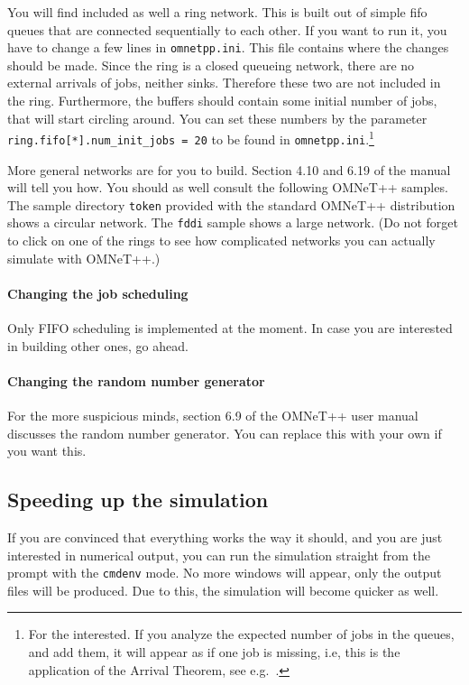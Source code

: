 \documentclass[a4paper]{article}
\begin{document}
You will find included as well a ring network. This is built out of
simple fifo queues that are connected sequentially to each other. If
you want to run it, you have to change a few lines in
\texttt{omnetpp.ini}. This file contains where the changes should be
made. Since the ring is a closed queueing network, there are no
external arrivals of jobs, neither sinks. Therefore these two are not
included in the ring. Furthermore, the buffers should contain some
initial number of jobs, that will start circling around. You can set
these numbers by the parameter \texttt{ring.fifo[*].num\_init\_jobs =
  20} to be found in \texttt{omnetpp.ini}.\footnote{For the
  interested. If you analyze the expected number of jobs in the
  queues, and add them, it will appear as if one job is missing, i.e,
 this is the application of the Arrival Theorem, see e.g.~\cite{Ross93}.}

More general networks are for you to build. Section 4.10 and 6.19 of
the manual will
tell you how. You should as well consult the following OMNeT++
samples. The sample directory \texttt{token} provided with the
standard OMNeT++ distribution shows a circular network. The
\texttt{fddi} sample shows a large network. (Do not forget to click on
one of the rings to see how complicated networks you can actually
simulate with OMNeT++.)


\paragraph{Changing the job scheduling}
\label{sec:chang-job-sched}
Only FIFO scheduling is implemented at the moment. In case you are
interested in building other ones, go ahead.

\paragraph{Changing the random number generator}
\label{sec:chang-rand-numb}
For the more suspicious minds, section 6.9 of the OMNeT++
user manual discusses the random number generator. You can replace
this with your own if you want this.


\subsection{Speeding up the simulation}
\label{sec:speed-up-simul}
If you are convinced that everything works the way it should, and you
are just interested in numerical output, you can run the simulation
straight from the prompt with the \texttt{cmdenv} mode. No more
windows will appear, only the output files will be produced. Due to
this, the simulation will become quicker as well.
\end{document}

